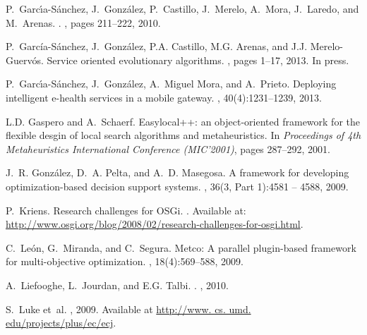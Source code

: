 \documentclass{sig-alternate}
\begin{document}
\begin{thebibliography}{10}
P.~Garc{\'\i}a-S{\'a}nchez, J.~Gonz{\'a}lez, P.~Castillo, J.~Merelo, A.~Mora,
  J.~Laredo, and M.~Arenas.
.
, pages 211--222, 2010.

P.~Garc{\'i}a-S{\'a}nchez, J.~Gonz{\'a}lez, P.A. Castillo, M.G. Arenas, and
  J.J. Merelo-Guerv{\'o}s.
\newblock Service oriented evolutionary algorithms.
, pages 1--17, 2013.
\newblock In press.

P.~Garc\'{\i}a-S{\'a}nchez, J.~Gonz{\'a}lez, A.~Miguel Mora, and A.~Prieto.
\newblock Deploying intelligent e-health services in a mobile gateway.
, 40(4):1231--1239, 2013.

L.D. Gaspero and A.~Schaerf.
\newblock Easylocal++: an object-oriented framework for the flexible desgin of
  local search algorithms and metaheuristics.
\newblock In {\em Proceedings of 4th Metaheuristics International Conference
  (MIC'2001)}, pages 287--292, 2001.

J.~R. Gonz\'alez, D.~A. Pelta, and A.~D. Masegosa.
\newblock A framework for developing optimization-based decision support
  systems.
, 36(3, Part 1):4581 -- 4588,
  2009.

P.~Kriens.
\newblock Research challenges for {OSGi}.
.
\newblock Available at:
  \url{http://www.osgi.org/blog/2008/02/research-challenges-for-osgi.html}.

C.~Le\'on, G.~Miranda, and C.~Segura.
\newblock Metco: A parallel plugin-based framework for multi-objective
  optimization.
,
  18(4):569--588, 2009.

A.~Liefooghe, L.~Jourdan, and E.G. Talbi.
.
, 2010.

S.~Luke et~al.
, 2009.
\newblock Available at \url{http://www. cs. umd. edu/projects/plus/ec/ecj}.


\end{thebibliography}
\end{document}
